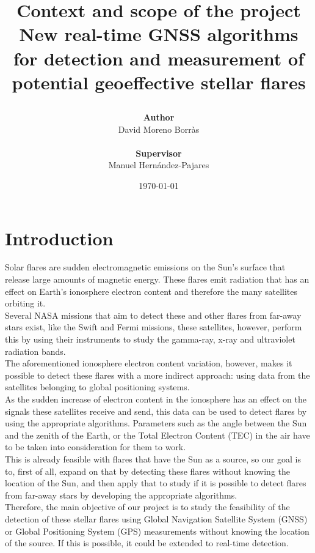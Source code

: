 \documentclass[12pt]{article}
\title{
	{\textbf{Context and scope of the project} \\
	\large New real-time GNSS algorithms for detection and measurement of potential geoeffective stellar flares}
\author{\textbf{Author}\\
	David Moreno Borr\`as
	\\ \\
	\textbf{Supervisor}\\
	 Manuel Hernández-Pajares}
\date{\today}
}
\begin{document}
	
\clearpage
\maketitle
\thispagestyle{empty}
\clearpage


\tableofcontents
\thispagestyle{empty}
\clearpage


\section{Introduction}

Solar flares are sudden electromagnetic emissions on the Sun’s surface that release large amounts of magnetic energy. These flares emit radiation that has an effect on Earth’s ionosphere electron content and therefore the many satellites orbiting it. \cite{hernandez2012gnss}\\

Several NASA missions that aim to detect these and other flares from far-away stars exist, like the Swift and Fermi missions, these satellites, however, perform this by using their instruments to study the gamma-ray, x-ray and ultraviolet radiation bands. \cite{gehrels2013gamma}\\

The aforementioned ionosphere electron content variation, however, makes it possible to detect these flares with a more indirect approach: using data from the satellites belonging to global positioning systems.\\

As the sudden increase of electron content in the ionosphere has an effect on the signals these satellites receive and send, this data can be used to detect flares by using the appropriate algorithms. Parameters such as the angle between the Sun and the zenith of the Earth, or the Total Electron Content (TEC) in the air have to be taken into consideration for them to work. \\

This is already feasible with flares that have the Sun as a source, so our goal is to, first of all, expand on that by detecting these flares without knowing the location of the Sun, and then apply that to study if it is possible to detect flares from far-away stars by developing the appropriate algorithms.\\

Therefore, the main objective of our project is to study the feasibility of the detection of these stellar flares using Global Navigation Satellite System (GNSS) or Global Positioning System (GPS) measurements without knowing the location of the source. If this is possible, it could be extended to real-time detection.\\
\end{document}

